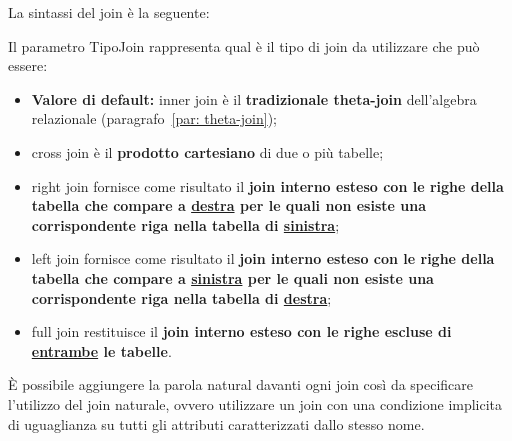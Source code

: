 \documentclass[a4paper]{article}
\begin{document}
	La sintassi del \textsf{join} è la seguente:
	
	Il parametro \textsf{TipoJoin} rappresenta qual è il tipo di join da utilizzare che può essere:
	\begin{itemize}
		\item \textbf{Valore di default:} \textcolor{Red3}{\textsf{inner join}} è il \textbf{tradizionale theta-join} dell'algebra relazionale (paragrafo~\ref{par: theta-join});
		
		\item \textcolor{Red3}{\textsf{cross join}} è il \textbf{prodotto cartesiano} di due o più tabelle;

		\item \textcolor{Red3}{\textsf{right join}} fornisce come risultato il \textbf{join interno esteso con le righe della tabella che compare a \underline{destra} per le quali non esiste una corrispondente riga nella tabella di \underline{sinistra}};

		\item \textcolor{Red3}{\textsf{left join}} fornisce come risultato il \textbf{join interno esteso con le righe della tabella che compare a \underline{sinistra} per le quali non esiste una corrispondente riga nella tabella di \underline{destra}};	

		\item \textcolor{Red3}{\textsf{full join}} restituisce il \textbf{join interno esteso con le righe escluse di \underline{entrambe} le tabelle}.
	\end{itemize}
	È possibile aggiungere la parola \textcolor{Red3}{\textsf{natural}} davanti ogni join così da specificare l'utilizzo del join naturale, ovvero utilizzare un join con una condizione implicita di uguaglianza su tutti gli attributi caratterizzati dallo stesso nome.\newline
	
\end{document}
